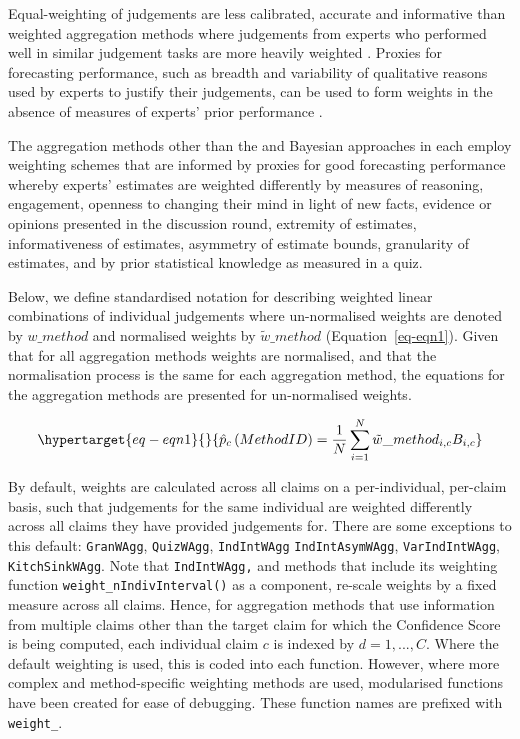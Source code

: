 \documentclass[article]{jss}
\newcommand{\fct}[1]{\code{#1()}}
\begin{document}
Equal-weighting of judgements are less calibrated, accurate and
informative than weighted aggregation methods where judgements from
experts who performed well in similar judgement tasks are more heavily
weighted \citep{Hanea2021}. Proxies for forecasting performance, such as
breadth and variability of qualitative reasons used by experts to
justify their judgements, can be used to form weights in the absence of
measures of experts' prior performance \citep{Hanea2021}.

The aggregation methods other than the \fct{AverageWAgg} and Bayesian
approaches in  each employ weighting schemes that are
informed by proxies for good forecasting performance whereby experts'
estimates are weighted differently by measures of reasoning, engagement,
openness to changing their mind in light of new facts, evidence or
opinions presented in the discussion round, extremity of estimates,
informativeness of estimates, asymmetry of estimate bounds, granularity
of estimates, and by prior statistical knowledge as measured in a quiz.

Below, we define standardised notation for describing weighted linear
combinations of individual judgements where un-normalised weights are
denoted by \(w\_method\) and normalised weights by
\(\tilde{w} \_ method\) (Equation~\ref{eq-eqn1}). Given that for all
aggregation methods weights are normalised, and that the normalisation
process is the same for each aggregation method, the equations for the
aggregation methods are presented for un-normalised weights.

\begin{equation}\protect\hypertarget{eq-eqn1}{}{
\hat{p}_c\left(Method \space ID \right) = \frac{1}{N}\sum_{i=1}^N \tilde{w}\_{method}_{i,c}  B_{i,c}
}\label{eq-eqn1}\end{equation}

By default, weights are calculated across all claims on a
per-individual, per-claim basis, such that judgements for the same
individual are weighted differently across all claims they have provided
judgements for. There are some exceptions to this default:
\texttt{GranWAgg}, \texttt{QuizWAgg}, \texttt{IndIntWAgg}
\texttt{IndIntAsymWAgg}, \texttt{VarIndIntWAgg}, \texttt{KitchSinkWAgg}.
Note that \texttt{IndIntWAgg,} and methods that include its weighting
function \texttt{weight\_nIndivInterval()} as a component, re-scale
weights by a fixed measure across all claims. Hence, for aggregation
methods that use information from multiple claims other than the target
claim for which the Confidence Score is being computed, each individual
claim \(c\) is indexed by \(d = 1, ..., C\). Where the default weighting
is used, this is coded into each function. However, where more complex
and method-specific weighting methods are used, modularised functions
have been created for ease of debugging. These function names are
prefixed with \texttt{weight\_}.
\end{document}
